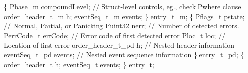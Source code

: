 \begin{code}
  \{
  Pbase\_m compoundLevel;   // Struct-level controls, eg., check Pwhere clause
  order\_header\_t\_m h;
  eventSeq\_t\_m events;
\} entry\_t\_m;
\mbox{}
  \{
  Pflags\_t pstate;         // Normal, Partial, or Panicking 
  Puint32 nerr;            // Number of detected errors.
  PerrCode\_t errCode;      // Error code of first detected error
  Ploc\_t loc;              // Location of first error
  order\_header\_t\_pd h;     // Nested header information
  eventSeq\_t\_pd events;    // Nested event sequence information
\} entry\_t\_pd;
\mbox{}
  \{
  order\_header\_t h;
  eventSeq\_t events;
\} entry\_t;
\end{code}
